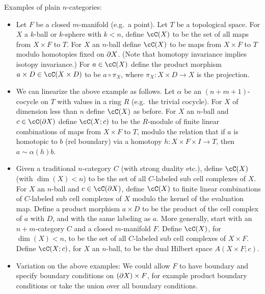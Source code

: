 Examples of plain $n$-categories:
\begin{itemize}

\item Let $F$ be a closed $m$-manifold (e.g.\ a point).
Let $T$ be a topological space.
For $X$ a $k$-ball or $k$-sphere with $k < n$, define $\cC(X)$ to be the set of 
all maps from $X\times F$ to $T$.
For $X$ an $n$-ball define $\cC(X)$ to be maps from $X\times F$ to $T$ modulo
homotopies fixed on $\partial X$.
(Note that homotopy invariance implies isotopy invariance.)
For $a\in \cC(X)$ define the product morphism $a\times D \in \cC(X\times D)$ to
be $a\circ\pi_X$, where $\pi_X : X\times D \to X$ is the projection.

\item We can linearize the above example as follows.
Let $\alpha$ be an $(n{+}m{+}1)$-cocycle on $T$ with values in a ring $R$
(e.g.\ the trivial cocycle).
For $X$ of dimension less than $n$ define $\cC(X)$ as before.
For $X$ an $n$-ball and $c\in \cC(\bd X)$ define $\cC(X; c)$ to be
the $R$-module of finite linear combinations of maps from $X\times F$ to $T$,
modulo the relation that if $a$ is homotopic to $b$ (rel boundary) via a homotopy
$h: X\times F\times I \to T$, then $a \sim \alpha(h)b$.

\item Given a traditional $n$-category $C$ (with strong duality etc.),
define $\cC(X)$ (with $\dim(X) < n$) 
to be the set of all $C$-labeled sub cell complexes of $X$.
For $X$ an $n$-ball and $c\in \cC(\bd X)$, define $\cC(X)$ to finite linear
combinations of $C$-labeled sub cell complexes of $X$
modulo the kernel of the evaluation map.
Define a product morphism $a\times D$ to be the product of the cell complex of $a$ with $D$,
and with the same labeling as $a$.
More generally, start with an $n{+}m$-category $C$ and a closed $m$-manifold $F$.
Define $\cC(X)$, for $\dim(X) < n$,
to be the set of all $C$-labeled sub cell complexes of $X\times F$.
Define $\cC(X; c)$, for $X$ an $n$-ball,
to be the dual Hilbert space $A(X\times F; c)$.

\item Variation on the above examples:
We could allow $F$ to have boundary and specify boundary conditions on $(\partial X)\times F$,
for example product boundary conditions or take the union over all boundary conditions.

\end{itemize}


